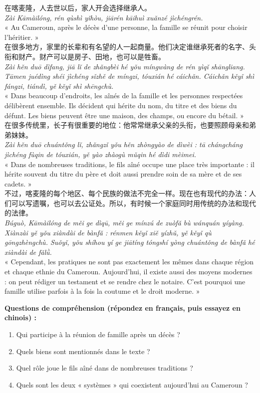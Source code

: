\documentclass[11pt]{article}
\begin{document}
\begin{textebox}
在喀麦隆，人去世以后，家人开会选择继承人。\\[4pt]
\emph{Zài Kāmàilóng, rén qùshì yǐhòu, jiārén kāihuì xuǎnzé jìchéngrén.}\\
« Au Cameroun, après le décès d'une personne, la famille se réunit pour choisir l'héritier. »\\[8pt]
在很多地方，家里的长辈和有名望的人一起商量。他们决定谁继承死者的名字、头衔和财产。财产可以是房子、田地，也可以是牲畜。\\
\emph{Zài hěn duō dìfang, jiā lǐ de zhǎngbèi hé yǒu míngwàng de rén yìqǐ shāngliang. Tāmen juédìng shéi jìchéng sǐzhě de míngzi, tóuxián hé cáichǎn. Cáichǎn kěyǐ shì fángzi, tiándì, yě kěyǐ shì shēngchù.}\\
« Dans beaucoup d'endroits, les aînés de la famille et les personnes respectées délibèrent ensemble. Ils décident qui hérite du nom, du titre et des biens du défunt. Les biens peuvent être une maison, des champs, ou encore du bétail. »\\[8pt]
在很多传统里，长子有很重要的地位：他常常继承父亲的头衔，也要照顾母亲和弟弟妹妹。\\
\emph{Zài hěn duō chuántǒng lǐ, zhǎngzǐ yǒu hěn zhòngyào de dìwèi : tā chángcháng jìchéng fùqin de tóuxián, yě yào zhàogù mǔqin hé dìdi mèimei.}\\
« Dans de nombreuses traditions, le fils aîné occupe une place très importante : il hérite souvent du titre du père et doit aussi prendre soin de sa mère et de ses cadets. »\\[8pt]
不过，喀麦隆的每个地区、每个民族的做法不完全一样。现在也有现代的办法：人们可以写遗嘱，也可以去公证处。所以，有时候一个家庭同时用传统的办法和现代的法律。\\
\emph{Búguò, Kāmàilóng de měi ge dìqū, měi ge mínzú de zuòfǎ bù wánquán yíyàng. Xiànzài yě yǒu xiàndài de bànfǎ : rénmen kěyǐ xiě yízhǔ, yě kěyǐ qù gōngzhèngchù. Suǒyǐ, yǒu shíhou yí ge jiātíng tóngshí yòng chuántǒng de bànfǎ hé xiàndài de fǎlǜ.}\\
« Cependant, les pratiques ne sont pas exactement les mêmes dans chaque région et chaque ethnie du Cameroun. Aujourd'hui, il existe aussi des moyens modernes : on peut rédiger un testament et se rendre chez le notaire. C'est pourquoi une famille utilise parfois à la fois la coutume et le droit moderne. »
\end{textebox}

\textbf{Questions de compréhension (répondez en français, puis essayez en chinois) :}
\begin{enumerate}
\item Qui participe à la réunion de famille après un décès ?
\item Quels biens sont mentionnés dans le texte ?
\item Quel rôle joue le fils aîné dans de nombreuses traditions ?
\item Quels sont les deux « systèmes » qui coexistent aujourd'hui au Cameroun ?
\end{enumerate}
\end{document}
